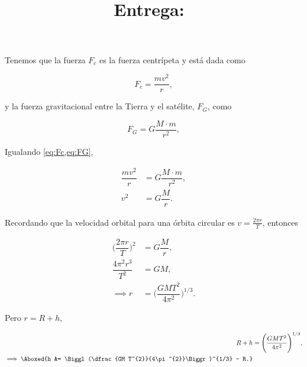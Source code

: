 \documentclass[12pt]{article}
\title{
    \textbf{\homeworkassignment}\\
    \normalsize\vspace{0.1in}\small{\textbf{Entrega}:~\DTMusedate{duedate}}
    \vspace{-1.5in}
}
\author{}
\date{}
\begin{document}
    \maketitle
    \thispagestyle{fancy}

    Tenemos que la fuerza \(F_{c}\) es la fuerza centrípeta y está dada como

    \begin{equation}
        F_{c} = \dfrac{m v^{2}}{r},
        \label{eq:Fc}
    \end{equation}

    y la fuerza gravitacional entre la Tierra y el satélite, \(F_{G}\), como

    \begin{equation}
        F_{G} = G \dfrac{M\cdot m}{r^{2}},
        \label{eq:FG}
    \end{equation}

    Igualando \cref{eq:Fc,eq:FG},

    \begin{align*}
        \dfrac{mv^{2}}{r} &= G \dfrac{M\cdot m}{r^{2}},\\
        v^{2} &= G \dfrac{M}{r}.
    \end{align*}

    Recordando que la velocidad orbital para una órbita circular es \(v = \tfrac{2\pi r}{T}\), entonces

    \begin{align*}
        \Biggl(\dfrac{2\pi r}{T}\Biggr)^{2} &= G \dfrac{M}{r},\\
        \dfrac{4\pi^{2} r^{3}}{T^{2}} &= GM,\\
        \implies r &= \Biggl(\dfrac{GM T^{2}}{4\pi^{2}}\Biggr)^{1/3}.
    \end{align*}

    Pero \(r = R + h\),

    \begin{align*}
        R + h &= \Biggl(\dfrac{GM T^{2}}{4\pi^{2}}\Biggr)^{1/3},\\
        \implies \Aboxed{h &= \Biggl(\dfrac{GM T^{2}}{4\pi^{2}}\Biggr)^{1/3} - R.}
    \end{align*}
\end{document}
